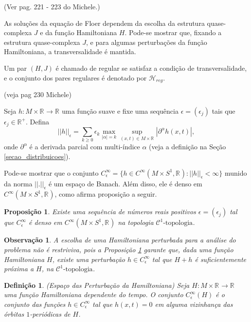 \documentclass[12pt]{book}
\newtheorem{definicao}[teorema]{Definição}
\newtheorem{observacao}[teorema]{Observação}
\newtheorem{proposicao}[teorema]{Proposição}
\newcommand{\circulo}{S^{1}}
\newcommand{\cktopologia}[1]{\mathcal{C}^{#1}\text{-topologia}}
\newcommand{\funcoessuaves}[1]{C^{\infty}(#1, \real{})}
\newcommand{\norma}[1]{||#1||}
\newcommand{\paresregulares}{\mathcal{H}_{reg}}
\newcommand{\perturbacaoHamiltoniana}[1]{C^{\infty}_{\epsilon}(#1)}
\newcommand{\real}[1]{\mathbb{R}^{#1}}
\newcommand{\reta}{\real{}}
\newcommand{\aviso}[1]{{\color{violet}(#1)}}
\begin{document}
	\aviso{Ver pag. 221 - 223 do Michele.}
	
	As soluções da equação de Floer dependem da escolha da estrutura quase-complexa $J$ e da função Hamiltoniana $H$. Pode-se mostrar que, fixando a estrutura quase-complexa $J$, e para algumas perturbações da função Hamiltoniana, a transversalidade é mantida.
	
	Um par $(H, J)$ é chamado de regular se satisfaz a condição de transversalidade, e o conjunto dos pares regulares é denotado por $\paresregulares$.
	
	\aviso{veja pag 230 Michele}
		
	Seja $h :M\times \reta\to \reta$ uma função suave e fixe uma sequência $\epsilon=(\epsilon_{j})$ tais que $\epsilon_{j}\in \real{+}$. Defina
	$$
	\norma{h}_{\epsilon} = \sum_{k\geq 0}\epsilon_{k}\max_{|\alpha|=k} \sup_{(x,t)\in M\times \reta}|\partial^{\alpha}h(x,t)|,
	$$
	onde $\partial^{\alpha}$ é a derivada parcial com multi-índice $\alpha$ (veja a definição na Seção \ref{secao_distribuicoes}).
	
	Pode-se mostrar que o conjunto $C^{\infty}_{\epsilon} = \{h\in \funcoessuaves{M\times \circulo}: \norma{h}_{\epsilon}<\infty \}$ munido da norma $\norma{.}_{\epsilon}$ é um espaço de Banach. Além disso, ele é denso em $\funcoessuaves{M\times\circulo}$, como afirma proposição a seguir.
	
	\begin{proposicao}\label{proposicao_densidade_perturbacao_hamiltoniana}
		Existe uma sequência de números reais positivos $\epsilon=(\epsilon_{j})$ tal que $C^{\infty}_{\epsilon}$ é denso em $\funcoessuaves{M\times\circulo}$ na topologia $\cktopologia{1}$.
	\end{proposicao}
	
	\begin{observacao}
		A escolha de uma Hamiltoniana perturbada para a análise do problema não é restriviva, pois a Proposição \ref{proposicao_densidade_perturbacao_hamiltoniana} garante que, dada uma função Hamiltoniana $H$, existe uma perturbação $h\in C^{\infty}_{\epsilon}$ tal que $H+h$ é suficientemente próxima a $H$, na $\cktopologia{1}$.
	\end{observacao}
	

	\begin{definicao}
		(Espaço das Perturbação da Hamiltoniana) Seja $H :M\times \reta\to \reta$ uma função Hamiltoniana dependente do tempo. O conjunto $\perturbacaoHamiltoniana{H}$ é o conjunto das funções $h \in C^{\infty}_{\epsilon}$ tal que $h(x,t) = 0$ em alguma vizinhança das órbitas $1$-periódicas de $H$.
	\end{definicao}
\end{document}
